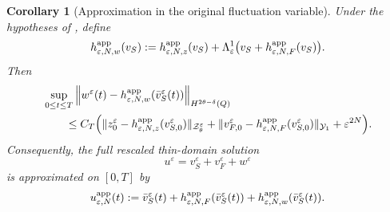 \documentclass[11pt]{article}
\newtheorem{corollary}[theorem]{Corollary}
\theoremstyle{definition}
\theoremstyle{remark}
\numberwithin{equation}{section}
\begin{document}
\begin{corollary}[Approximation in the original fluctuation variable]
\label{cor:thin-domain-original-variable-approximation}
Under the hypotheses of , define
\[
h_{\varepsilon,N,w}^{\rm app}(v_S)
:=
h_{\varepsilon,N,z}^{\rm app}(v_S)
+
\Lambda_\varepsilon^1
\bigl(
v_S+h_{\varepsilon,N,F}^{\rm app}(v_S)
\bigr).
\]
Then
\[
\begin{aligned}
&\sup_{0\le t\le T}
\left\|
w^\varepsilon(t)
-
h_{\varepsilon,N,w}^{\rm app}(\bar v_S^\varepsilon(t))
\right\|_{H^{2\theta-\delta}(Q)}
\\
&\qquad\le
C_T
\Big(
\|z_0^\varepsilon
-
h_{\varepsilon,N,z}^{\rm app}(v_{S,0}^\varepsilon)
\|_{\mathcal Z_\theta^\varepsilon}
+
\|v_{F,0}^\varepsilon
-
h_{\varepsilon,N,F}^{\rm app}(v_{S,0}^\varepsilon)
\|_{\mathcal Y_1}
+
\varepsilon^{2N}
\Big).
\end{aligned}
\]
Consequently, the full rescaled thin-domain solution
\[
u^\varepsilon
=
v_S^\varepsilon+v_F^\varepsilon+w^\varepsilon
\]
is approximated on \([0,T]\) by
\[
u_{\varepsilon,N}^{\rm app}(t)
:=
\bar v_S^\varepsilon(t)
+
h_{\varepsilon,N,F}^{\rm app}(\bar v_S^\varepsilon(t))
+
h_{\varepsilon,N,w}^{\rm app}(\bar v_S^\varepsilon(t)).
\]
\end{corollary}
\end{document}
